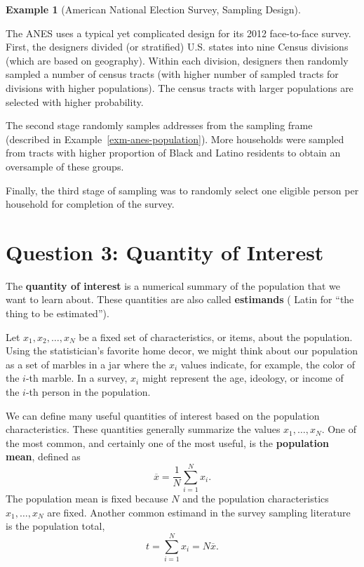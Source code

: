 \documentclass[
  13pt,
  letterpaper,
  DIV=11,
  numbers=noendperiod]{scrreprt}
\theoremstyle{plain}
\theoremstyle{plain}
\theoremstyle{definition}
\theoremstyle{definition}
\newtheorem{example}{Example}[chapter]
\theoremstyle{remark}
\begin{document}
\begin{example}[American National Election Survey, Sampling
Design]\protect\hypertarget{exm-anes-design}{}\label{exm-anes-design}

The ANES uses a typical yet complicated design for its 2012 face-to-face
survey. First, the designers divided (or stratified) U.S. states into
nine Census divisions (which are based on geography). Within each
division, designers then randomly sampled a number of census tracts
(with higher number of sampled tracts for divisions with higher
populations). The census tracts with larger populations are selected
with higher probability.

The second stage randomly samples addresses from the sampling frame
(described in Example~\ref{exm-anes-population}). More households were
sampled from tracts with higher proportion of Black and Latino residents
to obtain an oversample of these groups.

Finally, the third stage of sampling was to randomly select one eligible
person per household for completion of the survey.

\end{example}

\section{Question 3: Quantity of
Interest}\label{question-3-quantity-of-interest}

The \textbf{quantity of interest} is a numerical summary of the
population that we want to learn about. These quantities are also called
\textbf{estimands} ( Latin for ``the thing to be estimated'').

Let \(x_1, x_2, \ldots, x_N\) be a fixed set of characteristics, or
items, about the population. Using the statistician's favorite home
decor, we might think about our population as a set of marbles in a jar
where the \(x_i\) values indicate, for example, the color of the
\(i\)-th marble. In a survey, \(x_i\) might represent the age, ideology,
or income of the \(i\)-th person in the population.

We can define many useful quantities of interest based on the population
characteristics. These quantities generally summarize the values
\(x_1, \ldots, x_N\). One of the most common, and certainly one of the
most useful, is the \textbf{population mean}, defined as \[
\overline{x} = \frac{1}{N} \sum_{i=1}^N x_i.
\] The population mean is fixed because \(N\) and the population
characteristics \(x_1, \ldots, x_N\) are fixed. Another common estimand
in the survey sampling literature is the population total, \[
t = \sum_{i=1}^N x_i = N\overline{x}.
\]
\end{document}

